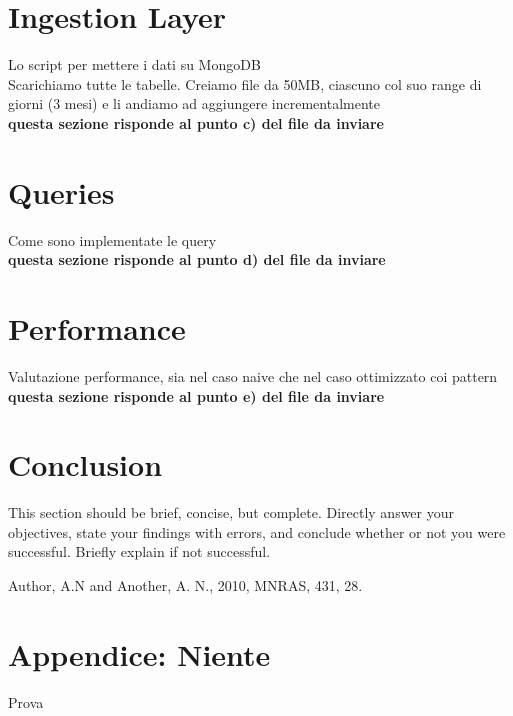 \documentclass[letterpaper,11pt]{article}
\begin{document}
\section{Ingestion Layer}
Lo script per mettere i dati su MongoDB\\
Scarichiamo tutte le tabelle. Creiamo file da 50MB, ciascuno col suo range di giorni (3 mesi) e li andiamo ad aggiungere incrementalmente
\\
\textbf{questa sezione risponde al punto c) del file da inviare}

\section{Queries}
Come sono implementate le query\\
\textbf{questa sezione risponde al punto d) del file da inviare}

\section{Performance}
Valutazione performance, sia nel caso naive che nel caso ottimizzato coi pattern\\
\textbf{questa sezione risponde al punto e) del file da inviare}

\section{Conclusion}
This section should be brief, concise, but complete. Directly answer your objectives, state your findings with errors, and conclude whether or not you were successful. Briefly explain if not successful.

\begin{thebibliography}{99}

Author, A.N and Another, A. N., 2010, MNRAS, 431, 28.

\end{thebibliography}

\appendix

\section*{Appendice: Niente}

Prova
\end{document}
